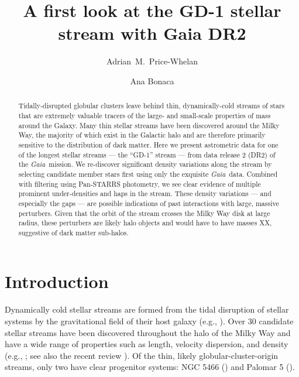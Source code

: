 \documentclass[modern]{aastex62}
\newcommand{\acronym}[1]{{\small{#1}}}
\newcommand{\gaia}{\textsl{Gaia}}
\newcommand{\DR}{\acronym{DR2}}
\begin{document}
\sloppy\sloppypar\raggedbottom\frenchspacing %

\title{A first look at the GD-1 stellar stream with Gaia DR2}

\author[0000-0003-0872-7098]{Adrian~M.~Price-Whelan}

\author[0000-0002-7846-9787]{Ana Bonaca}


\begin{abstract}\noindent %
Tidally-disrupted globular clusters leave behind thin, dynamically-cold streams
of stars that are extremely valuable tracers of the large- and small-scale
properties of mass around the Galaxy.
Many thin stellar streams have been discovered around the Milky Way, the
majority of which exist in the Galactic halo and are therefore primarily
sensitive to the distribution of dark matter.
Here we present astrometric data for one of the longest stellar streams --- the
``GD-1'' stream --- from data release 2 (\DR) of the \gaia\ mission.
We re-discover significant density variations along the stream by selecting
candidate member stars first using only the exquisite \gaia\ data.
Combined with filtering using Pan-STARRS photometry, we see clear evidence of
multiple prominent under-densities and haps in the stream.
These density variations --- and especially the gaps --- are possible
indications of past interactions with large, massive perturbers.
Given that the orbit of the stream crosses the Milky Way disk at large radius,
these perturbers are likely halo objects and would have to have masses XX,
suggestive of dark matter sub-halos.
\end{abstract}


\section{Introduction}
\label{sec:intro}

Dynamically cold stellar streams are formed from the tidal disruption of stellar
systems by the gravitational field of their host galaxy (e.g.,
\citealt{Johnston:1998}).
Over 30 candidate stellar streams have been discovered throughout the halo of
the Milky Way and have a wide range of properties such as length, velocity
dispersion, and density (e.g., \citealt{SoManyPeople,Bonaca:2012}; see also the
recent review \citealt{Grillmair:2006, Newberg:2016}).
Of the thin, likely globular-cluster-origin streams, only two have clear
progenitor systems: NGC 5466 (\citealt{TODO}) and Palomar 5 (\citealt{TODO}).
\end{document}
